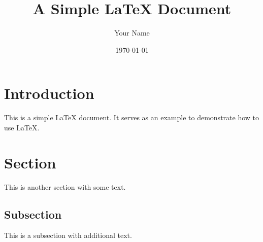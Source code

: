 \documentclass{article}
\title{A Simple LaTeX Document}
\author{Your Name}
\date{\today}
\begin{document}
\maketitle

\section{Introduction}
This is a simple LaTeX document. It serves as an example to demonstrate how to use LaTeX.

\section{Section}
This is another section with some text.

\subsection{Subsection}
This is a subsection with additional text.
\end{document}
